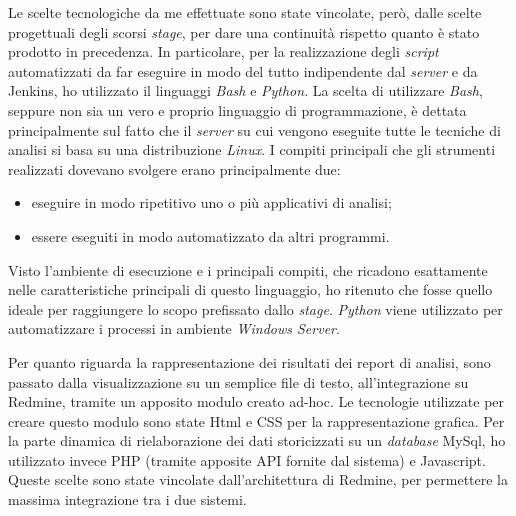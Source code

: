 Le scelte tecnologiche da me effettuate sono state vincolate, però, dalle scelte progettuali degli scorsi \textit{stage}, per dare una continuità rispetto quanto è stato prodotto in precedenza. In particolare, per la realizzazione degli \textit{script} automatizzati da far eseguire in modo del tutto indipendente dal \textit{server} e da Jenkins, ho utilizzato il linguaggi \textit{Bash} e \textit{Python}.
La scelta di utilizzare \textit{Bash}, seppure non sia un vero e proprio linguaggio di programmazione, è dettata principalmente sul fatto che il \textit{server} su cui vengono eseguite tutte le tecniche di analisi si basa su una distribuzione \textit{Linux}. I compiti principali che gli strumenti realizzati dovevano svolgere erano principalmente due:
\begin{itemize}
\item eseguire in modo ripetitivo uno o più applicativi di analisi;
\item essere eseguiti in modo automatizzato da altri programmi.
\end{itemize}
Visto l'ambiente di esecuzione e i principali compiti, che ricadono esattamente nelle caratteristiche principali di questo linguaggio, ho ritenuto che fosse quello ideale per raggiungere lo scopo prefissato dallo \textit{stage}. \textit{Python} viene utilizzato per automatizzare i processi in ambiente \textit{Windows Server}. 

Per quanto riguarda la rappresentazione dei risultati dei report di analisi, sono passato dalla visualizzazione su un semplice file di testo, all'integrazione su Redmine, tramite un apposito modulo creato ad-hoc. Le tecnologie utilizzate per creare questo modulo sono state Html e CSS per la rappresentazione grafica. Per la parte dinamica di rielaborazione dei dati storicizzati su un \textit{database} MySql, ho utilizzato invece PHP (tramite apposite API fornite dal sistema) e Javascript. Queste scelte sono state vincolate dall'architettura di Redmine, per permettere la massima integrazione tra i due sistemi.




